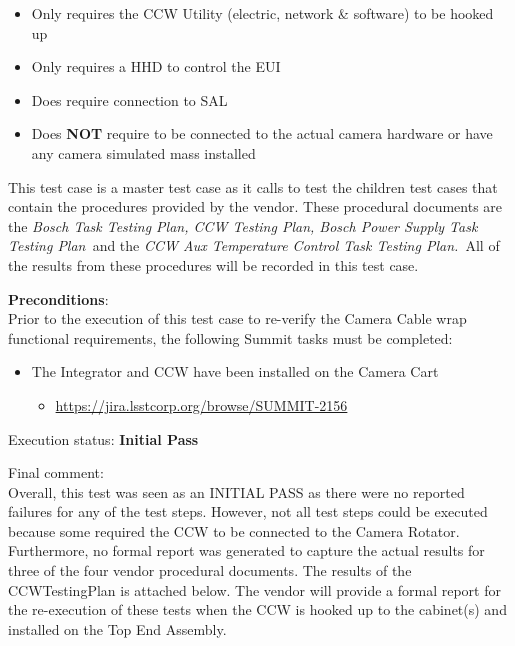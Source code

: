 \documentclass[SE,lsstdraft,STR,toc]{lsstdoc}
\providecommand{\tightlist}{
  \setlength{\itemsep}{0pt}\setlength{\parskip}{0pt}}
\begin{document}
\begin{itemize}
\tightlist
\item
  Only requires the CCW Utility (electric, network \& software) to be
  hooked up
\item
  Only requires a HHD to control the EUI
\item
  Does require connection to SAL
\item
  Does \textbf{NOT} require to be connected to the actual camera
  hardware or have any camera simulated mass installed
\end{itemize}

This test case is a master test case as it calls to test the children
test cases that contain the procedures provided by the vendor. These
procedural documents are the \emph{Bosch Task Testing Plan, CCW Testing
Plan, Bosch Power Supply Task Testing Plan~}and the \emph{CCW Aux
Temperature Control Task Testing Plan.~}All of the results from these
procedures will be recorded in this test case.~


\textbf{ Preconditions}:\\
 Prior to the execution of this test case to re-verify the Camera Cable
wrap functional requirements, the following Summit tasks must be
completed:

\begin{itemize}
\tightlist
\item
  The Integrator and CCW have been installed on the Camera Cart

  \begin{itemize}
  \tightlist
  \item
    \url{https://jira.lsstcorp.org/browse/SUMMIT-2156}
  \end{itemize}
\end{itemize}


Execution status: {\bf Initial Pass }

Final comment:\\ Overall, this test was seen as an INITIAL PASS as there were no reported
failures for any of the test steps. However, not all test steps could be
executed because some required the CCW to be connected to the Camera
Rotator. Furthermore, no formal report was generated to capture the
actual results for three of the four vendor procedural documents. The
results of the CCWTestingPlan is attached below. The vendor will provide
a formal report for the re-execution of these tests when the CCW is
hooked up to the cabinet(s) and installed on the Top End Assembly.~
\end{document}
